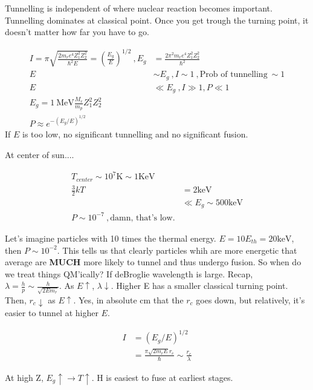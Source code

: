 \documentclass[10pt,a4paper]{article}
\begin{document}
Tunnelling is independent of where nuclear reaction becomes important. Tunnelling dominates at classical point. Once you get trough the turning point, it doesn't matter how far you have to go. 

\begin{align}
I = \pi \sqrt{ \frac{2m_r e^4 Z_1^2 Z_2^2}{\hbar^2 E} } = \left(\frac{E_g}{E} \right)^{1/2}~, E_g &= \frac{2\pi^2 m_r e^4 Z_1^2 Z_2^2}{\hbar^2}\\
E &\sim E_g~, I \sim 1~,\text{Prob of tunnelling}~ \sim 1\\
E& \ll E_g~, I \gg 1, P \ll 1\\
E_g = 1 ~\text{MeV} \frac{M_r}{m_p}Z_1^2 Z_2^2\\
P \approx e^{-(E_g/E)^{1/2}}
\end{align}
If $E$ is too low, no significant tunnelling and no significant fusion.

At center of sun....

\begin{align}
T_{center} \sim 10^7 \text{K} \sim 1 \text{KeV}\\
\frac{3}{2}kT &= 2\text{keV}\\
& \ll E_g \sim 500 \text{keV}\\
P \sim 10^{-7}~,\text{damn, that's low.}
\end{align} 

Let's imagine particles with 10 times the thermal energy. $E = 10 E_{th} = 20\text{keV}$, then $P \sim 10^{-2}$. This tells us that clearly particles whih are more energetic that average are \textbf{MUCH} more likely to tunnel and thus undergo fusion. So when do we treat things QM'ically? If deBroglie wavelength is large. Recap, $\lambda = \frac{h}{p} \sim \frac{h}{\sqrt{2Em_r}}$. As $E \uparrow$, $\lambda \downarrow$. Higher E has a smaller classical turning point. Then, $r_c \downarrow$ as $E \uparrow$. Yes, in absolute cm that the $r_c$ goes down, but relatively, it's easier to tunnel at higher $E$. 

\begin{align}
I &= (E_g/E)^{1/2}\\
& = \frac{\pi \sqrt{2m_rE}r_c}{\hbar} \sim \frac{r_c}{\lambda}
\end{align}

At high Z, $E_g \uparrow \rightarrow T \uparrow$. H is easiest to fuse at earliest stages.
\end{document}
